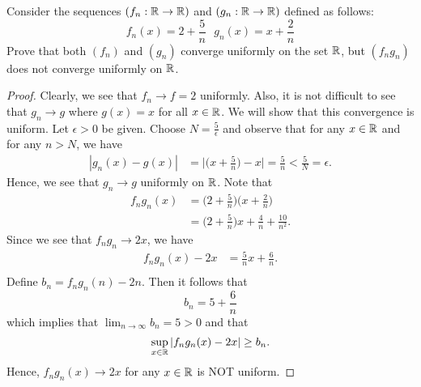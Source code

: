 \documentclass[a4paper]{article}
\begin{document}
\begin{problem}
    Consider the sequences \( ({f}_{n} : \mathbb{R} \to \mathbb{R} ) \) and \( ({g}_{n} : \mathbb{R} \to \mathbb{R} ) \) defined as follows:
    \[  {f}_{n}(x) = 2 + \frac{ 5 }{ n }  \ \ \ {g}_{n}(x) = x + \frac{ 2 }{ n }  \]
    Prove that both \( ({f}_{n}) \) and \( ({g}_{n}) \) converge uniformly on the set \( \mathbb{R}  \), but \( ({f}_{n}{g}_{n}) \) does not converge uniformly on \( \mathbb{R}  \).
\end{problem}
\begin{proof}
Clearly, we see that \( {f}_{n} \to f = 2 \) uniformly. Also, it is not difficult to see that \( {g}_{n} \to g   \) where \( g(x) = x  \) for all \( x \in \mathbb{R}  \). We will show that this convergence is uniform. Let \( \epsilon > 0  \) be given. Choose \( N = \frac{ 5  }{ \epsilon }  \) and observe that for any \( x \in \mathbb{R}  \) and for any \( n > N  \), we have 
\begin{align*}
    | {g}_{n}(x) - g(x) | &= \Big| \Big(  x + \frac{ 5 }{ n }  \Big) - x  \Big|  
                          = \frac{ 5  }{ n }  
                          < \frac{ 5 }{ N }  
                          = \epsilon.
\end{align*}
Hence, we see that \( {g}_{n} \to g  \) uniformly on \( \mathbb{R}  \). Note that 
\begin{align*}
    {f}_{n}{g}_{n}(x) &= \Big(  2 + \frac{ 5 }{ n }  \Big) \Big(  x + \frac{ 2 }{ n }  \Big) \\
                      &=  \Big( 2 + \frac{ 5 }{ n } \Big) x + \frac{ 4 }{ n } + \frac{ 10}{ n^{2}  }.
\end{align*}
Since we see that \( {f}_{n} {g}_{n} \to 2x \), we have 
\begin{align*}
    {f}_{n}{g}_{n}(x) - 2x &= \frac{ 5 }{ n } x + \frac{ 6 }{ n }.  \\
\end{align*}
Define \( {b}_{n} = {f}_{n}{g}_{n}(n) - 2n \). Then it follows that 
\[  {b}_{n} = 5 + \frac{ 6 }{ n }  \]
which implies that \( \lim_{ n \to \infty  } {b}_{n} = 5 > 0  \) and that 
\[  \sup_{x \in \mathbb{R} } | {f}_{n}{g}_{n}(x) - 2x | \geq {b}_{n}.  \]
Hence, \( {f}_{n}{g}_{n}(x) \to 2x  \) for any \( x \in \mathbb{R}  \) is NOT uniform.
\end{proof}
\end{document}
